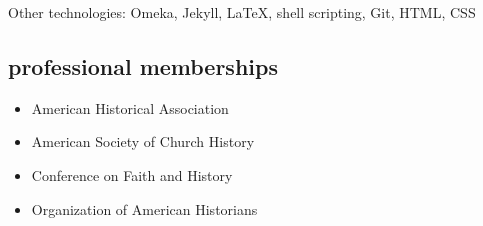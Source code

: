 \documentclass[11pt]{article}
\begin{document}
Other technologies: Omeka, Jekyll, \LaTeX, shell scripting, Git, HTML,
CSS

\subsection{professional memberships}\label{professional-memberships}

\begin{itemize}
  \item
    American Historical Association
  \item
    American Society of Church History
  \item
    Conference on Faith and History
  \item
    Organization of American Historians
\end{itemize}
\end{document}
